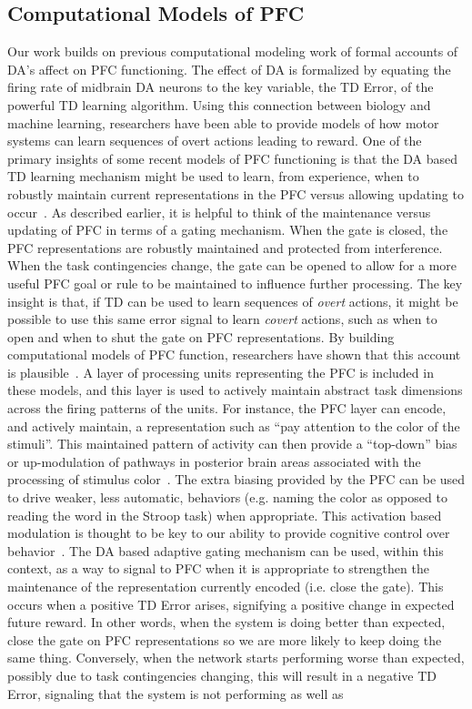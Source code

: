 \bigskip

\subsection{Computational Models of PFC}
Our work builds on previous computational modeling work of formal accounts of DA's affect on PFC functioning.  The effect of DA is formalized by equating the firing rate of midbrain DA neurons to the key variable, the TD Error, of the powerful TD learning algorithm.  Using this connection between biology and machine learning, researchers have been able to provide models of how motor systems can learn sequences of overt actions leading to reward.  One of the primary insights of some recent models of PFC functioning is that the DA based TD learning mechanism might be used to learn, from experience, when to robustly maintain current representations in the PFC versus allowing updating to occur~\cite{BraverTS:2000:Control}.  As described earlier, it is helpful to think of the maintenance versus updating of PFC in terms of a gating mechanism.  When the gate is closed, the PFC representations are robustly maintained and protected from interference.  When the task contingencies change, the gate can be opened to allow for a more useful PFC goal or rule to be maintained to influence further processing.  The key insight is that, if TD can be used to learn sequences of \emph{overt} actions, it might be possible to use this same error signal to learn \emph{covert} actions, such as when to open and when to shut the gate on PFC representations.  By building computational models of PFC function, researchers have shown that this account is plausible~\cite{BraverTS:2000:Control,OReillyRC:2002:IDED}.  A layer of processing units representing  the PFC is included in these models, and this layer is used to actively maintain abstract task dimensions across the firing patterns of the units.  For instance, the PFC layer can encode, and actively maintain, a representation such as ``pay attention to the color of the stimuli''.  This maintained pattern of activity can then provide a ``top-down'' bias or up-modulation of pathways in posterior brain areas associated with the processing of stimulus color~\cite{CohenJD:1990:Stroop}.  The extra biasing provided by the PFC can be used to drive weaker, less automatic, behaviors (e.g. naming the color as opposed to reading the word in the Stroop task) when appropriate.  This activation based modulation is thought to be key to our ability to provide cognitive control over behavior~\cite{CohenJD:1992:Schizophrenia}.  The DA based adaptive gating mechanism can be used, within this context, as a way to signal to PFC when it is appropriate to strengthen the maintenance of the representation currently encoded (i.e. close the gate).  This occurs when a positive TD Error arises, signifying a positive change in expected future reward.  In other words, when the system is doing better than expected, close the gate on PFC representations so we are more likely to keep doing the same thing.  Conversely, when the network starts performing worse than expected, possibly due to task contingencies changing, this will result in a negative TD Error, signaling that the system is not performing as well as 